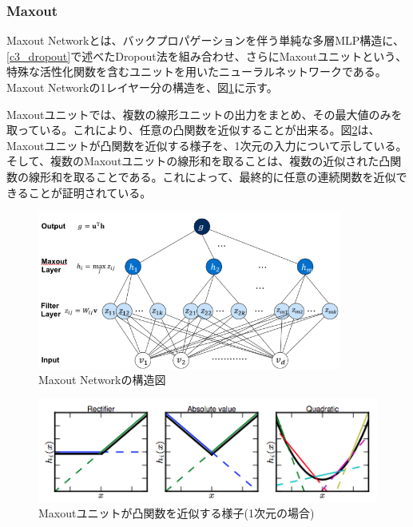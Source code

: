 \subsubsection{Maxout}
Maxout Networkとは、バックプロパゲーションを伴う単純な多層MLP構造に、\ref{c3_dropout}で述べたDropout法を組み合わせ、さらにMaxoutユニットという、特殊な活性化関数を含むユニットを用いたニューラルネットワークである\cite{goodfellow2013maxout}。Maxout Networkの1レイヤー分の構造を、図\ref{c3_maxout_arch}に示す。\par
Maxoutユニットでは、複数の線形ユニットの出力をまとめ、その最大値のみを取っている。これにより、任意の凸関数を近似することが出来る。図\ref{c3_maxout_app}は、Maxoutユニットが凸関数を近似する様子を、1次元の入力について示している。そして、複数のMaxoutユニットの線形和を取ることは、複数の近似された凸関数の線形和を取ることである。これによって、最終的に任意の連続関数を近似できることが証明されている。%
\begin{figure}[tbp]
 \begin{center}
  \includegraphics[width=100mm]{img/c3/maxout_arch}
 \end{center}
 \caption{Maxout Networkの構造図}
 \label{c3_maxout_arch}
\end{figure}
\begin{figure}[tbp]
 \begin{center}
  \includegraphics[width=120mm]{img/c3/maxout_app}
 \end{center}
 \caption{Maxoutユニットが凸関数を近似する様子(1次元の場合)}
 \label{c3_maxout_app}
\end{figure}
